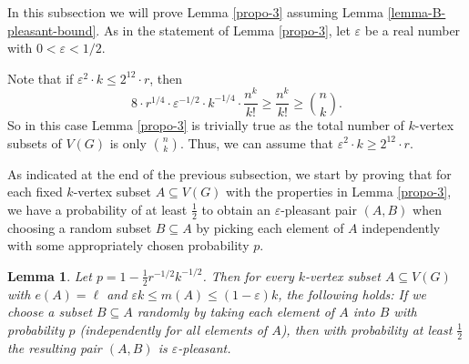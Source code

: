 \documentclass[11pt]{article}
\newtheorem{lemma}[theorem]{Lemma}
\theoremstyle{definition}
\numberwithin{equation}{section}
\begin{document}
In this subsection we will prove Lemma \ref{propo-3} assuming Lemma \ref{lemma-B-pleasant-bound}. As in the statement of Lemma \ref{propo-3}, let $\varepsilon$ be a real number with $0<\varepsilon<1/2$.

Note that if $\varepsilon^2\cdot k\leq 2^{12} \cdot r$, then
\[8\cdot r^{1/4}\cdot \varepsilon^{-1/2}\cdot k^{-1/4}\cdot \frac{n^k}{k!}\geq \frac{n^k}{k!}\geq {n \choose k}.\]
So in this case Lemma \ref{propo-3} is trivially true as the total number of $k$-vertex subsets of $V(G)$ is only ${n\choose k}$. Thus, we can assume that $\varepsilon^2\cdot k\geq 2^{12} \cdot r$.

As indicated at the end of the previous subsection, we start by proving that for each fixed $k$-vertex subset $A\subseteq V(G)$ with the properties in Lemma \ref{propo-3}, we have a probability of at least $\frac{1}{2}$ to obtain an $\varepsilon$-pleasant pair $(A,B)$ when choosing a random subset $B\subseteq A$ by picking each element of $A$ independently with some appropriately chosen probability $p$.

\begin{lemma}\label{lemma-A-3}Let $p=1-\frac{1}{2}r^{-1/2}k^{-1/2}$. Then for every $k$-vertex subset $A\subseteq V(G)$ with $e(A)=\ell$ and $\varepsilon k \leq m(A)\leq (1-\varepsilon) k$, the following holds: If we choose a subset $B\subseteq A$ randomly by taking each element of $A$ into $B$ with probability $p$ (independently for all elements of $A$), then with probability at least $\frac{1}{2}$ the resulting pair $(A,B)$ is $\varepsilon$-pleasant.
\end{lemma}
\end{document}
